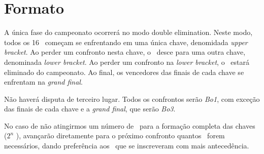 \section{Formato}

A única fase do campeonato ocorrerá no modo double elimination. Neste modo, todos os 16 \BasicUnitPl\ começam se enfrentando em uma única chave, denomidada \textit{upper bracket}. Ao perder um confronto nesta chave, o \BasicUnit\ desce para uma outra chave, denominada \textit{lower bracket}. Ao perder um confronto na \textit{lower bracket}, o \BasicUnit\ estará eliminado do campeonato. Ao final, os vencedores das finais de cada chave se enfrentam na \textit{grand final}.

Não haverá disputa de terceiro lugar. Todos os confrontos serão \textit{Bo1}, com exceção das finais de cada chave e a \textit{grand final}, que serão \textit{Bo3}.

No caso de não atingirmos um número de \BasicUnitPl\ para a formação completa das chaves (\(2^n\) \BasicUnitPl), avançarão diretamente para o próximo confronto quantos \BasicUnitPl\ forem necessários, dando preferência aos \BasicUnitPl\ que se inscreveram com mais antecedência.